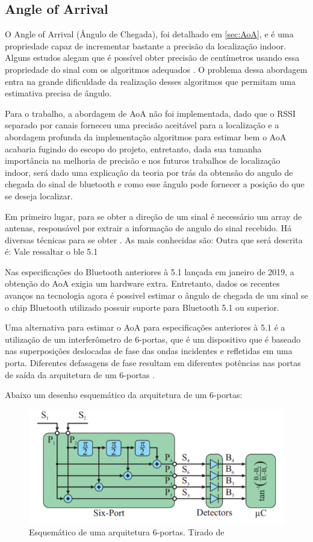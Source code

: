 \subsection{Angle of Arrival}
O Angle of Arrival (Ângulo de Chegada), foi detalhado em \ref{sec:AoA}, e é uma propriedade capaz de incrementar bastante a precisão da localização indoor. Alguns estudos alegam que é possível obter precisão de centímetros usando essa propriedade do sinal com os algoritmos adequados \cite{art9}. O problema dessa abordagem entra na grande dificuldade da realização desses algoritmos que permitam uma estimativa precisa de ângulo. 

Para o trabalho, a abordagem de AoA não foi implementada, dado que o RSSI separado por canais forneceu uma precisão aceitável para a localização e a abordagem profunda da implementação algoritmos para estimar bem o AoA acabaria fugindo do escopo do projeto, entretanto, dada sua tamanha importância na melhoria de precisão e nos futuros trabalhos de localização indoor, será dado uma explicação da teoria por trás da obtensão do angulo de chegada do sinal de bluetooth e como esse ângulo pode fornecer a posição do que se deseja localizar.


Em primeiro lugar, para se obter a direção de um sinal é necessário um array de antenas, responsável por extrair a informação de angulo do sinal recebido. Há diversas técnicas para se obter . As mais conhecidas são: Outra que será descrita é:
Vale ressaltar o ble 5.1

Nas especificações do Bluetooth anteriores à 5.1 lançada em janeiro de 2019, a obtenção do AoA exigia um hardware extra.
Entretanto, dados os recentes avanços na tecnologia agora é possivel estimar o ângulo de chegada de um sinal se o chip Bluetooth utilizado possuir suporte para Bluetooth 5.1 ou superior.

Uma alternativa para estimar o AoA para especificações anteriores à 5.1 é a utilização de um interferômetro de 6-portas, que é um dispositivo que é baseado nas superposições deslocadas de fase das ondas incidentes e refletidas em uma porta. Diferentes defasagens de fase resultam em diferentes potências nas portas de saída da arquitetura de um 6-portas \cite{art14}.

Abaixo um desenho esquemático da arquitetura de um 6-portas:

\begin{figure}[H]
	\centering
	\includegraphics[scale = 1]{images/six_port_schematic.png}
	\caption{Esquemático de uma arquitetura 6-portas. Tirado de \cite{art15} }
	\label{fig:six_port_schematic}
\end{figure}

